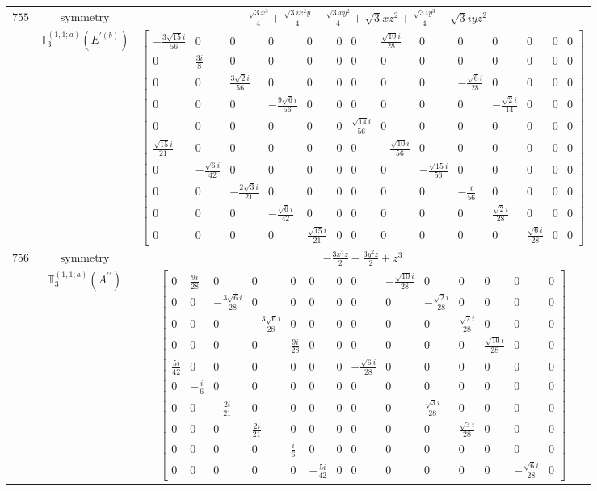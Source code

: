 \documentclass[fleqn,8pt,landscape]{jsarticle}
\begin{document}
\begin{longtable}{ccc}
$ 755 $ & $ \text{symmetry} $ & $ - \frac{\sqrt{3} x^{3}}{4} + \frac{\sqrt{3} i x^{2} y}{4} - \frac{\sqrt{3} x y^{2}}{4} + \sqrt{3} x z^{2} + \frac{\sqrt{3} i y^{3}}{4} - \sqrt{3} i y z^{2} $ \\
$  $ & $ \mathbb{T}_{3}^{(1,1;a)}(E^{\prime(b)}) $ & $ \begin{bmatrix} - \frac{3 \sqrt{15} i}{56} & 0 & 0 & 0 & 0 & 0 & 0 & \frac{\sqrt{10} i}{28} & 0 & 0 & 0 & 0 & 0 & 0 \\ 0 & \frac{3 i}{8} & 0 & 0 & 0 & 0 & 0 & 0 & 0 & 0 & 0 & 0 & 0 & 0 \\ 0 & 0 & \frac{3 \sqrt{2} i}{56} & 0 & 0 & 0 & 0 & 0 & 0 & - \frac{\sqrt{6} i}{28} & 0 & 0 & 0 & 0 \\ 0 & 0 & 0 & - \frac{9 \sqrt{6} i}{56} & 0 & 0 & 0 & 0 & 0 & 0 & - \frac{\sqrt{2} i}{14} & 0 & 0 & 0 \\ 0 & 0 & 0 & 0 & 0 & 0 & \frac{\sqrt{14} i}{56} & 0 & 0 & 0 & 0 & 0 & 0 & 0 \\ \frac{\sqrt{15} i}{21} & 0 & 0 & 0 & 0 & 0 & 0 & - \frac{\sqrt{10} i}{56} & 0 & 0 & 0 & 0 & 0 & 0 \\ 0 & - \frac{\sqrt{6} i}{42} & 0 & 0 & 0 & 0 & 0 & 0 & - \frac{\sqrt{15} i}{56} & 0 & 0 & 0 & 0 & 0 \\ 0 & 0 & - \frac{2 \sqrt{3} i}{21} & 0 & 0 & 0 & 0 & 0 & 0 & - \frac{i}{56} & 0 & 0 & 0 & 0 \\ 0 & 0 & 0 & - \frac{\sqrt{6} i}{42} & 0 & 0 & 0 & 0 & 0 & 0 & \frac{\sqrt{2} i}{28} & 0 & 0 & 0 \\ 0 & 0 & 0 & 0 & \frac{\sqrt{15} i}{21} & 0 & 0 & 0 & 0 & 0 & 0 & \frac{\sqrt{6} i}{28} & 0 & 0 \end{bmatrix} $ \\ \hline
$ 756 $ & $ \text{symmetry} $ & $ - \frac{3 x^{2} z}{2} - \frac{3 y^{2} z}{2} + z^{3} $ \\
$  $ & $ \mathbb{T}_{3}^{(1,1;a)}(A^{\prime\prime}) $ & $ \begin{bmatrix} 0 & \frac{9 i}{28} & 0 & 0 & 0 & 0 & 0 & 0 & - \frac{\sqrt{10} i}{28} & 0 & 0 & 0 & 0 & 0 \\ 0 & 0 & - \frac{3 \sqrt{6} i}{28} & 0 & 0 & 0 & 0 & 0 & 0 & - \frac{\sqrt{2} i}{28} & 0 & 0 & 0 & 0 \\ 0 & 0 & 0 & - \frac{3 \sqrt{6} i}{28} & 0 & 0 & 0 & 0 & 0 & 0 & \frac{\sqrt{2} i}{28} & 0 & 0 & 0 \\ 0 & 0 & 0 & 0 & \frac{9 i}{28} & 0 & 0 & 0 & 0 & 0 & 0 & \frac{\sqrt{10} i}{28} & 0 & 0 \\ \frac{5 i}{42} & 0 & 0 & 0 & 0 & 0 & 0 & - \frac{\sqrt{6} i}{28} & 0 & 0 & 0 & 0 & 0 & 0 \\ 0 & - \frac{i}{6} & 0 & 0 & 0 & 0 & 0 & 0 & 0 & 0 & 0 & 0 & 0 & 0 \\ 0 & 0 & - \frac{2 i}{21} & 0 & 0 & 0 & 0 & 0 & 0 & \frac{\sqrt{3} i}{28} & 0 & 0 & 0 & 0 \\ 0 & 0 & 0 & \frac{2 i}{21} & 0 & 0 & 0 & 0 & 0 & 0 & \frac{\sqrt{3} i}{28} & 0 & 0 & 0 \\ 0 & 0 & 0 & 0 & \frac{i}{6} & 0 & 0 & 0 & 0 & 0 & 0 & 0 & 0 & 0 \\ 0 & 0 & 0 & 0 & 0 & - \frac{5 i}{42} & 0 & 0 & 0 & 0 & 0 & 0 & - \frac{\sqrt{6} i}{28} & 0 \end{bmatrix} $ \\ \hline

\end{longtable}
\end{document}
